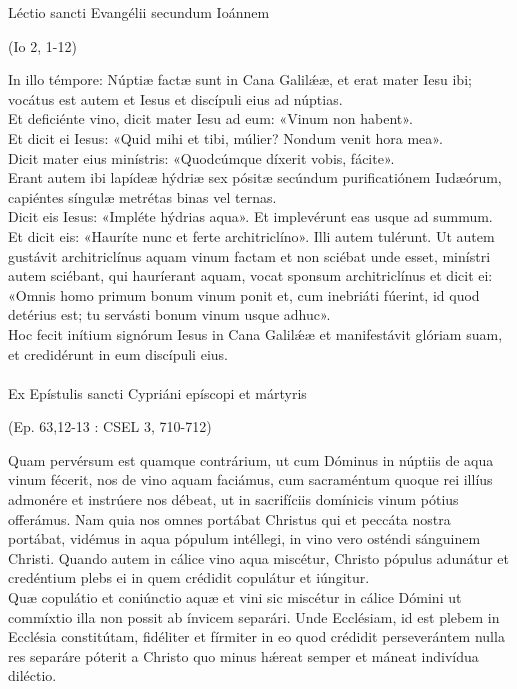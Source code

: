 \documentclass[options]{article}
\begin{document}
	Léctio sancti Evangélii secundum Ioánnem 
	\begin{flushright}
		 (Io 2, 1-12)
	\end{flushright}
	In illo témpore:
	Núptiæ factæ sunt in Cana Galil\'{æ}æ, et erat mater Iesu ibi; vocátus est autem et Iesus et discípuli eius ad núptias.\\
	Et deficiénte vino, dicit mater Iesu ad eum: «Vinum non habent».\\
	Et dicit ei Iesus: «Quid mihi et tibi, múlier? Nondum venit hora mea».\\
	Dicit mater eius minístris: «Quodcúmque díxerit vobis, fácite».\\
	Erant autem ibi lapídeæ hýdriæ sex pósitæ secúndum purificatiónem Iudæórum, capiéntes síngulæ metrétas binas vel ternas.\\
	Dicit eis Iesus: «Impléte hýdrias aqua». Et implevérunt eas usque ad summum. Et dicit eis: «Hauríte nunc et ferte architriclíno». Illi autem tulérunt.
	Ut autem gustávit architriclínus aquam vinum factam et non sciébat unde esset, minístri autem sciébant, qui hauríerant aquam, vocat sponsum architriclínus et dicit ei: «Omnis homo primum bonum vinum ponit et, cum inebriáti fúerint, id quod detérius est; tu servásti bonum vinum usque adhuc».\\
	Hoc fecit inítium signórum Iesus in Cana Galil\'{æ}æ et manifestávit glóriam suam, et credidérunt in eum discípuli eius.\\
	\\
	Ex Epístulis sancti Cypriáni epíscopi et mártyris
	\begin{flushright}
		(Ep. 63,12-13 : CSEL 3, 710-712)	
	\end{flushright}
	Quam pervérsum est quamque contrárium, ut cum Dóminus in núptiis de aqua vinum fécerit, nos de vino aquam faciámus, cum sacraméntum quoque rei illíus admonére et instrúere nos débeat, ut in sacrifíciis domínicis vinum pótius offerámus. Nam quia nos omnes portábat Christus qui et peccáta nostra portábat, vidémus in aqua pópulum intéllegi, in vino vero osténdi sánguinem Christi. Quando autem in cálice vino aqua miscétur, Christo pópulus adunátur et credéntium plebs ei in quem crédidit copulátur et iúngitur.\\
	
	Quæ copulátio et coniúnctio aquæ et vini sic miscétur in cálice Dómini ut commíxtio illa non possit ab ínvicem separári. Unde Ecclésiam, id est plebem in Ecclésia constitútam, fidéliter et fírmiter in eo quod crédidit perseverántem nulla res separáre póterit a Christo quo minus h\'{æ}reat semper et máneat indivídua diléctio.\\
	
\end{document}
